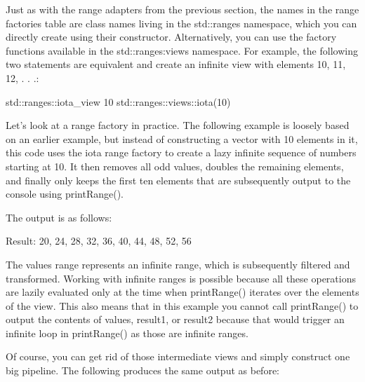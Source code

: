 Just as with the range adapters from the previous section, the names in the range factories table are class names living in the std::ranges namespace, which you can directly create using their constructor. Alternatively, you can use the factory functions available in the std::ranges:views namespace. For example, the following two statements are equivalent and create an infinite view with elements 10, 11, 12, . . .:

\begin{cpp}
std::ranges::iota_view { 10 }
std::ranges::views::iota(10)
\end{cpp}

Let’s look at a range factory in practice. The following example is loosely based on an earlier example, but instead of constructing a vector with 10 elements in it, this code uses the iota range factory to create a lazy infinite sequence of numbers starting at 10. It then removes all odd values, doubles the remaining elements, and finally only keeps the first ten elements that are subsequently output to the console using printRange().


The output is as follows:

\begin{shell}
Result: 20, 24, 28, 32, 36, 40, 44, 48, 52, 56
\end{shell}

The values range represents an infinite range, which is subsequently filtered and transformed. Working with infinite ranges is possible because all these operations are lazily evaluated only at the time when printRange() iterates over the elements of the view. This also means that in this example you cannot call printRange() to output the contents of values, result1, or result2 because that would trigger an infinite loop in printRange() as those are infinite ranges.

Of course, you can get rid of those intermediate views and simply construct one big pipeline. The following produces the same output as before:


